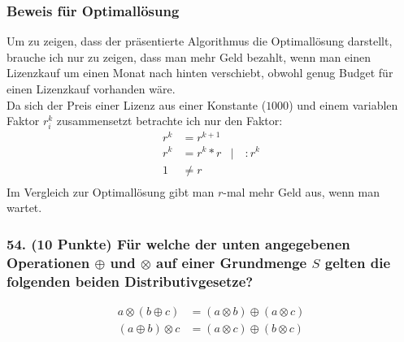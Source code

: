 \documentclass[ngerman,a4paper]{report}
\begin{document}
\subsubsection*{Beweis für Optimallösung}
Um zu zeigen, dass der präsentierte Algorithmus die Optimallösung darstellt, brauche ich nur zu zeigen, dass man mehr Geld bezahlt, wenn man einen Lizenzkauf um einen Monat nach hinten verschiebt, obwohl genug Budget für einen Lizenzkauf vorhanden wäre.\\
Da sich der Preis einer Lizenz aus einer Konstante ($1000$) und einem variablen Faktor $r^k_i$ zusammensetzt betrachte ich nur den Faktor:
\begin{align*}
r^k &= r^{k+1}\\
r^k &= r^k * r &|\quad : r^k \\
1 &\neq r\\
\end{align*}
Im Vergleich zur Optimallösung gibt man $r$-mal mehr Geld aus, wenn man wartet. \\

\subsubsection*{54. (10 Punkte) Für welche der unten angegebenen Operationen $\oplus$ und $\otimes$ auf einer Grundmenge $S$ gelten die folgenden beiden Distributivgesetze?} 

\begin{align*}
a \otimes (b \oplus c) &= (a \otimes b) \oplus (a \otimes c) \tag{a}\\
(a \oplus b) \otimes c &= (a \otimes c) \oplus (b \otimes c) \tag{b}
\end{align*}
\end{document}
